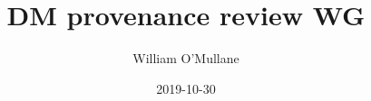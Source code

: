 \documentclass[DM,toc]{lsstdoc}
\title{DM provenance review WG}
\author{%
William O'Mullane
}
\date{2019-10-30}
\begin{document}
\maketitle





\appendix
\label{sec:bib}


%
\label{sec:acronyms}
\printglossaries
\end{document}
